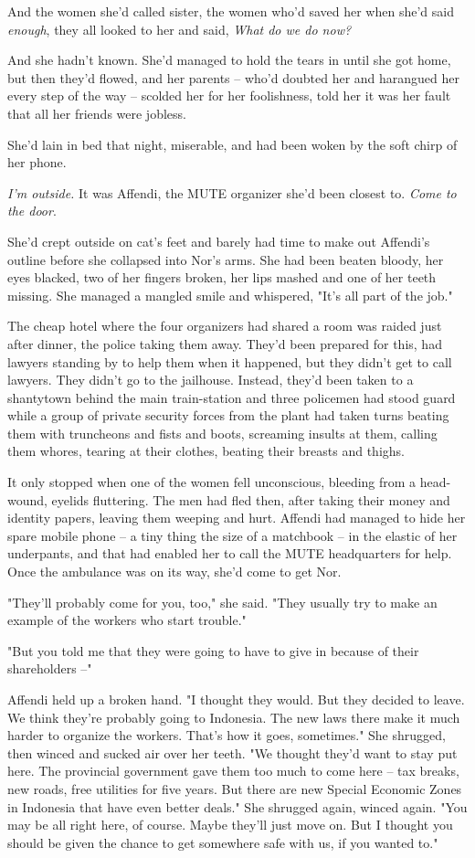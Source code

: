 And the women she'd called sister, the women who'd saved her when
she'd said \emph{enough}, they all looked to her and said,
\emph{What do we do now?}

And she hadn't known. She'd managed to hold the tears in until she
got home, but then they'd flowed, and her parents -- who'd doubted
her and harangued her every step of the way -- scolded her for her
foolishness, told her it was her fault that all her friends were
jobless.

She'd lain in bed that night, miserable, and had been woken by the
soft chirp of her phone.

\emph{I'm outside.} It was Affendi, the MUTE organizer she'd been
closest to. \emph{Come to the door}.

She'd crept outside on cat's feet and barely had time to make out
Affendi's outline before she collapsed into Nor's arms. She had
been beaten bloody, her eyes blacked, two of her fingers broken,
her lips mashed and one of her teeth missing. She managed a mangled
smile and whispered, "It's all part of the job."

The cheap hotel where the four organizers had shared a room was
raided just after dinner, the police taking them away. They'd been
prepared for this, had lawyers standing by to help them when it
happened, but they didn't get to call lawyers. They didn't go to
the jailhouse. Instead, they'd been taken to a shantytown behind
the main train-station and three policemen had stood guard while a
group of private security forces from the plant had taken turns
beating them with truncheons and fists and boots, screaming insults
at them, calling them whores, tearing at their clothes, beating
their breasts and thighs.

It only stopped when one of the women fell unconscious, bleeding
from a head-wound, eyelids fluttering. The men had fled then, after
taking their money and identity papers, leaving them weeping and
hurt. Affendi had managed to hide her spare mobile phone -- a tiny
thing the size of a matchbook -- in the elastic of her underpants,
and that had enabled her to call the MUTE headquarters for help.
Once the ambulance was on its way, she'd come to get Nor.

"They'll probably come for you, too," she said. "They usually try
to make an example of the workers who start trouble."

"But you told me that they were going to have to give in because of
their shareholders --"

Affendi held up a broken hand. "I thought they would. But they
decided to leave. We think they're probably going to Indonesia. The
new laws there make it much harder to organize the workers. That's
how it goes, sometimes." She shrugged, then winced and sucked air
over her teeth. "We thought they'd want to stay put here. The
provincial government gave them too much to come here -- tax
breaks, new roads, free utilities for five years. But there are new
Special Economic Zones in Indonesia that have even better deals."
She shrugged again, winced again. "You may be all right here, of
course. Maybe they'll just move on. But I thought you should be
given the chance to get somewhere safe with us, if you wanted to."

